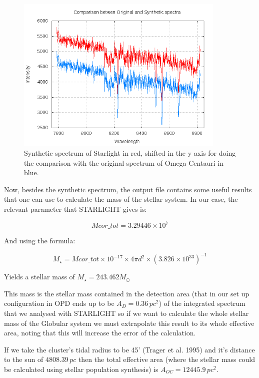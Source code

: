 \begin{figure}[H]
\centering
\includegraphics[width=10cm]{images/comparison.png}
\caption[Synthetic spectrum of STARLIGHT]{Synthetic spectrum of Starlight in red, shifted in the y axis for doing the comparison with the original spectrum of Omega Centauri in blue.}
\end{figure}
 
Now, besides the synthetic spectrum, the output file contains some useful results that one can use to calculate the mass of the stellar system. In our case, the relevant parameter that STARLIGHT gives is:

\begin{equation}
Mcor\_tot = 3.29446 \times 10^{7}
\end{equation}

And using the formula:

\begin{equation}
M_{\star}=Mcor\_tot\times10^{-17}\times4\pi d^{2}\times\left(3.826\times10^{33}\right)^{-1}
\end{equation}

Yields a stellar mass of $M_{\star}=243.462M_{\odot}$

This mass is the stellar mass contained in the detection area (that in our set up configuration in OPD ends up to be $A_{D}=0.36\,pc^{2}$) of the integrated spectrum that we analysed with STARLIGHT so if we want to calculate the whole stellar mass of the Globular system we must extrapolate this result to its whole effective area, noting that this will increase the error of the calculation.

If we take the cluster's tidal radius to be 45' (Trager et al. 1995) and it's distance to the sun of $4808.39\,pc$ then the total effective area (where the stellar mass could be calculated using stellar population synthesis) is $A_{OC}=12445.9\,pc^{2}$. 


